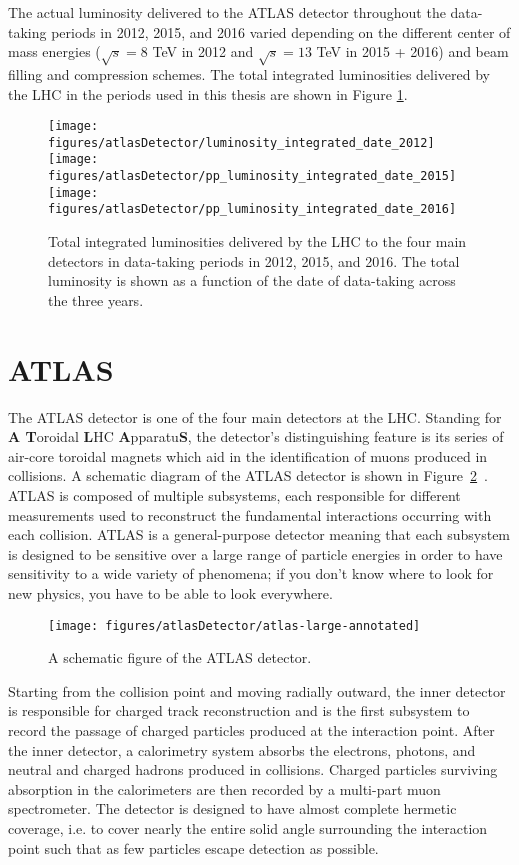 The actual luminosity delivered to the ATLAS detector throughout the data-taking periods in 2012, 2015, and 2016 varied depending on the different center of mass energies ($\sqrt{s} = 8$ TeV in 2012 and $\sqrt{s} = 13$ TeV in 2015 + 2016) and beam filling and compression schemes. The total integrated luminosities delivered by the LHC in the periods used in this thesis are shown in Figure \ref{fig:deliveredLumi}.

\begin{figure}[h!]
  \centering  
  \label{fig:deliveredLumi}
  \texttt{[image: figures/atlasDetector/luminosity\_integrated\_date\_2012]}
  \texttt{[image: figures/atlasDetector/pp\_luminosity\_integrated\_date\_2015]}
  \texttt{[image: figures/atlasDetector/pp\_luminosity\_integrated\_date\_2016]}
  \caption{Total integrated luminosities delivered by the LHC to the four main detectors in data-taking periods in 2012, 2015, and 2016. The total luminosity is shown as a function of the date of data-taking across the three years.}
\end{figure}


\section{ATLAS}
The ATLAS detector is one of the four main detectors at the LHC. Standing for \textbf{A T}oroidal \textbf{L}HC \textbf{A}pparatu\textbf{S}, the detector's distinguishing feature is its series of air-core toroidal magnets which aid in the identification of muons produced in collisions. A schematic diagram of the ATLAS detector is shown in Figure~\ref{fig:ATLAS}~\cite{Aad:2008zzm}. ATLAS is composed of multiple subsystems, each responsible for different measurements used to reconstruct the fundamental interactions occurring with each collision. ATLAS is a general-purpose detector meaning that each subsystem is designed to be sensitive over a large range of particle energies in order to have sensitivity to a wide variety of phenomena; if you don't know where to look for new physics, you have to be able to look everywhere. 

\begin{figure}[h]
\centering
\texttt{[image: figures/atlasDetector/atlas-large-annotated]}
\caption{A schematic figure of the ATLAS detector.}
\label{fig:ATLAS}
\end{figure}

Starting from the collision point and moving radially outward, the inner detector is responsible for charged track reconstruction and is the first subsystem to record the passage of charged particles produced at the interaction point. After the inner detector, a calorimetry system absorbs the electrons, photons, and neutral and charged hadrons produced in collisions. Charged particles surviving absorption in the calorimeters are then recorded by a multi-part muon spectrometer. The detector is designed to have almost complete hermetic coverage, i.e. to cover nearly the entire solid angle surrounding the interaction point such that as few particles escape detection as possible. 

